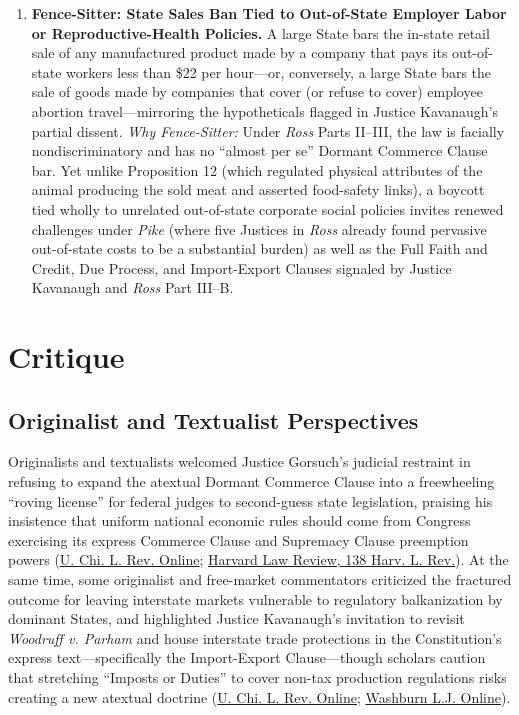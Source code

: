 \documentclass[12pt]{article}
\begin{document}
\begin{enumerate}
\item \textbf{Fence-Sitter: State Sales Ban Tied to Out-of-State Employer Labor or Reproductive-Health Policies.} A large State bars the in-state retail sale of any manufactured product made by a company that pays its out-of-state workers less than \$22 per hour---or, conversely, a large State bars the sale of goods made by companies that cover (or refuse to cover) employee abortion travel---mirroring the hypotheticals flagged in Justice Kavanaugh's partial dissent. \textit{Why Fence-Sitter:} Under \textit{Ross} Parts II--III, the law is facially nondiscriminatory and has no ``almost per se'' Dormant Commerce Clause bar. Yet unlike Proposition 12 (which regulated physical attributes of the animal producing the sold meat and asserted food-safety links), a boycott tied wholly to unrelated out-of-state corporate social policies invites renewed challenges under \textit{Pike} (where five Justices in \textit{Ross} already found pervasive out-of-state costs to be a substantial burden) as well as the Full Faith and Credit, Due Process, and Import-Export Clauses signaled by Justice Kavanaugh and \textit{Ross} Part III--B.
\end{enumerate}

\section{Critique}
\subsection{Originalist and Textualist Perspectives}
Originalists and textualists welcomed Justice Gorsuch's judicial restraint in refusing to expand the atextual Dormant Commerce Clause into a freewheeling ``roving license'' for federal judges to second-guess state legislation, praising his insistence that uniform national economic rules should come from Congress exercising its express Commerce Clause and Supremacy Clause preemption powers (\href{https://lawreview.uchicago.edu/online-archive/national-pork-producers-council-v-ross-invitation-revisit-import-export-clause}{U. Chi. L. Rev. Online}; \href{https://harvardlawreview.org/print/vol-138/federalism-rebalancing-and-the-roberts-court-a-departure-from-historical-patterns/}{Harvard Law Review, 138 Harv. L. Rev.}). At the same time, some originalist and free-market commentators criticized the fractured outcome for leaving interstate markets vulnerable to regulatory balkanization by dominant States, and highlighted Justice Kavanaugh's invitation to revisit \textit{Woodruff v. Parham} and house interstate trade protections in the Constitution's express text---specifically the Import-Export Clause---though scholars caution that stretching ``Imposts or Duties'' to cover non-tax production regulations risks creating a new atextual doctrine (\href{https://lawreview.uchicago.edu/online-archive/national-pork-producers-council-v-ross-invitation-revisit-import-export-clause}{U. Chi. L. Rev. Online}; \href{https://www.washburnlaw.edu/academics/experience/law-journal/wlj-online/volume-64/2022-03-vol-64-eating-out-of-both-troughs.html}{Washburn L.J. Online}).
\end{document}
